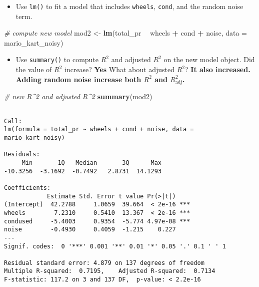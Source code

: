 \documentclass[
]{book}
\newenvironment{Shaded}{\begin{snugshade}}{\end{snugshade}}
\newcommand{\CommentTok}[1]{\textcolor[rgb]{0.56,0.35,0.01}{\textit{#1}}}
\newcommand{\DataTypeTok}[1]{\textcolor[rgb]{0.13,0.29,0.53}{#1}}
\newcommand{\KeywordTok}[1]{\textcolor[rgb]{0.13,0.29,0.53}{\textbf{#1}}}
\newcommand{\NormalTok}[1]{#1}
\newcommand{\OperatorTok}[1]{\textcolor[rgb]{0.81,0.36,0.00}{\textbf{#1}}}
\newcommand{\StringTok}[1]{\textcolor[rgb]{0.31,0.60,0.02}{#1}}
\providecommand{\tightlist}{%
  \setlength{\itemsep}{0pt}\setlength{\parskip}{0pt}}
\begin{document}
\begin{itemize}
\tightlist
\item
  Use \texttt{lm()} to fit a model that includes \texttt{wheels}, \texttt{cond}, and the random noise term.
\end{itemize}

\begin{Shaded}
\begin{Highlighting}[]
\CommentTok{# compute new model}
\NormalTok{mod2 <-}\StringTok{ }\KeywordTok{lm}\NormalTok{(total_pr }\OperatorTok{~}\StringTok{ }\NormalTok{wheels }\OperatorTok{+}\StringTok{ }\NormalTok{cond }\OperatorTok{+}\StringTok{ }\NormalTok{noise, }\DataTypeTok{data =}\NormalTok{ mario_kart_noisy)}
\end{Highlighting}
\end{Shaded}

\begin{itemize}
\tightlist
\item
  Use \texttt{summary()} to compute \(R^2\) and adjusted \(R^2\) on the new model object. Did the value of \(R^2\) increase? \textbf{Yes} What about adjusted \(R^2\)? \textbf{It also increased.} \textbf{Adding random noise increase both \(R^2\) and \(R^2_{\text{adj}}\).}
\end{itemize}

\begin{Shaded}
\begin{Highlighting}[]
\CommentTok{# new R^2 and adjusted R^2}
\KeywordTok{summary}\NormalTok{(mod2)}
\end{Highlighting}
\end{Shaded}

\begin{verbatim}

Call:
lm(formula = total_pr ~ wheels + cond + noise, data = mario_kart_noisy)

Residuals:
     Min       1Q   Median       3Q      Max 
-10.3256  -3.1692  -0.7492   2.8731  14.1293 

Coefficients:
            Estimate Std. Error t value Pr(>|t|)    
(Intercept)  42.2788     1.0659  39.664  < 2e-16 ***
wheels        7.2310     0.5410  13.367  < 2e-16 ***
condused     -5.4003     0.9354  -5.774 4.97e-08 ***
noise        -0.4930     0.4059  -1.215    0.227    
---
Signif. codes:  0 '***' 0.001 '**' 0.01 '*' 0.05 '.' 0.1 ' ' 1

Residual standard error: 4.879 on 137 degrees of freedom
Multiple R-squared:  0.7195,    Adjusted R-squared:  0.7134 
F-statistic: 117.2 on 3 and 137 DF,  p-value: < 2.2e-16
\end{verbatim}
\end{document}
